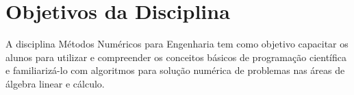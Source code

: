 \section{Objetivos da Disciplina}

A disciplina Métodos Numéricos para Engenharia tem como objetivo capacitar os alunos para utilizar e compreender os conceitos básicos de programação científica e familiarizá-lo com algoritmos para solução numérica de problemas nas áreas de álgebra linear e cálculo.
